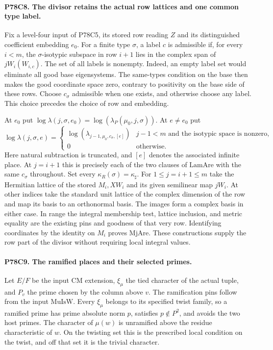 \paragraph{P78C8. The divisor retains the actual row lattices and one common type label.}
Fix a level-four input of P78C5, its stored row reading $Z$ and its
distinguished coefficient embedding $e_0$. For a finite type $\sigma$,
a label $c$ is admissible if, for every $i<m$, the $\sigma$-isotypic
subspace in row $i+1$ lies in the complex span of
$jW_i(W_{i,c})$. The set of all labels is nonempty. Indeed, an empty
label set would eliminate all good base eigensystems. The same-types
condition on the base then makes the good coordinate space zero, contrary
to positivity on the base side of these rows. Choose $c_\sigma$ admissible
when one exists, and otherwise choose any label. This choice precedes the
choice of row and embedding.

At $e_0$ put $\log\lambda(j,\sigma,e_0)=
\log(\lambda_P(\mu_0,j,\sigma))$. At $e\ne e_0$ put
\[
 \log\lambda(j,\sigma,e)=
 \begin{cases}
 \log(\lambda_{j-1,\mu_0,c_\sigma,[e]})&
 j-1<m\text{ and the isotypic space is nonzero},\\
 0&\text{otherwise}.
 \end{cases}
\]
Here natural subtraction is truncated, and $[e]$ denotes the associated
infinite place. At $j=i+1$ this is precisely each of the two clauses of
$\mathrm{LamAre}$ with the same $c_\sigma$ throughout. Set every
$\kappa_R(\sigma)=\kappa_\sharp$. For $1\le j=i+1\le m$ take the
Hermitian lattice of the stored $M_i,XW_i$ and its given semilinear map
$jW_i$. At other indices take the standard unit lattice of the complex
dimension of the row and map its basis to an orthonormal basis. The images
form a complex basis in either case. In range the integral membership
test, lattice inclusion, and metric equality are the existing pins and
goodness of that very row. Identifying coordinates by the identity on
$M_i$ proves $\mathrm{MjAre}$. These constructions supply the row part of
the divisor without requiring local integral values.

\paragraph{P78C9. The ramified places and their selected primes.}
Let $E/F$ be the input CM extension, $\xi_\mu$ the tied character of
the actual tuple, and $P_v$ the prime chosen by the column above $v$.
The ramification pins follow from the input $\mathrm{MuIsW}$. Every
$\xi_\mu$ belongs to its specified twist family, so a ramified prime has
prime absolute norm $p$, satisfies $p\notin P^2$, and avoids the two
host primes. The character of $\mu(w)$ is unramified above the residue
characteristic of $w$. On the twisting set this is the prescribed local
condition on the twist, and off that set it is the trivial character.

